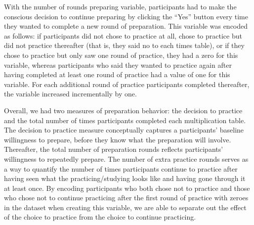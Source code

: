 \documentclass[a4paper,nobind]{templates/ociamthesis}
\begin{document}
With the number of rounds preparing variable, participants had to make the conscious decision to continue preparing by clicking the ``Yes'' button every time they wanted to complete a new round of preparation. This variable was encoded as follows: if participants did not chose to practice at all, chose to practice but did not practice thereafter (that is, they said no to each times table), or if they chose to practice but only saw one round of practice, they had a zero for this variable, whereas participants who said they wanted to practice again after having completed at least one round of practice had a value of one for this variable. For each additional round of practice participants completed thereafter, the variable increased incrementally by one.

Overall, we had two measures of preparation behavior: the decision to practice and the total number of times participants completed each multiplication table. The decision to practice measure conceptually captures a participants' baseline willingness to prepare, before they know what the preparation will involve. Thereafter, the total number of preparation rounds reflects participants' willingness to repeatedly prepare. The number of extra practice rounds serves as a way to quantify the number of times participants continue to practice after having seen what the practicing/studying looks like and having gone through it at least once. By encoding participants who both chose not to practice and those who chose not to continue practicing after the first round of practice with zeroes in the dataset when creating this variable, we are able to separate out the effect of the choice to practice from the choice to continue practicing.
\end{document}

